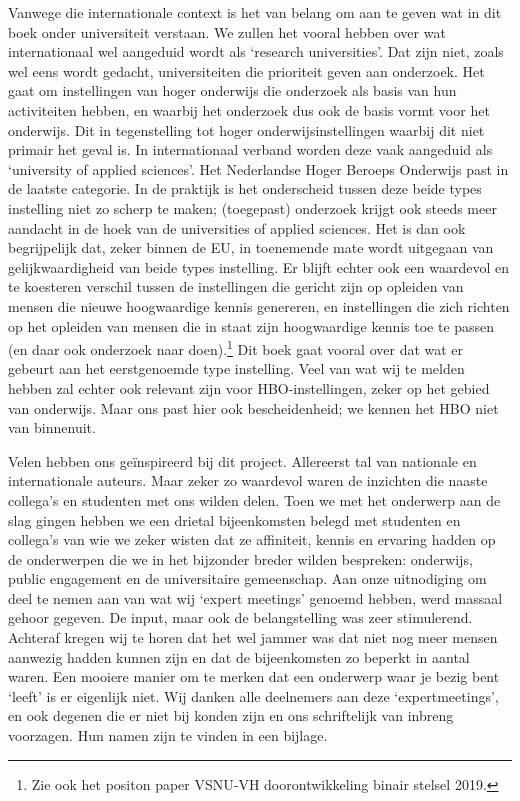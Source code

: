 \documentclass{jote-book}
\begin{document}
	Vanwege die internationale context is het van belang om aan te geven wat in dit boek onder universiteit verstaan. We zullen het vooral hebben over wat internationaal wel aangeduid wordt als ‘research universities'. Dat zijn niet, zoals wel eens wordt gedacht, universiteiten die prioriteit geven aan onderzoek. Het gaat om instellingen van hoger onderwijs die onderzoek als basis van hun activiteiten hebben, en waarbij het onderzoek dus ook de basis vormt voor het onderwijs. Dit in tegenstelling tot hoger onderwijsinstellingen waarbij dit niet primair het geval is. In internationaal verband worden deze vaak aangeduid als ‘university of applied sciences'. Het Nederlandse Hoger Beroeps Onderwijs past in de laatste categorie. In de praktijk is het onderscheid tussen deze beide types instelling niet zo scherp te maken; (toegepast) onderzoek krijgt ook steeds meer aandacht in de hoek van de universities of applied sciences. Het is dan ook begrijpelijk dat, zeker binnen de EU, in toenemende mate wordt uitgegaan van gelijkwaardigheid van beide types instelling. Er blijft echter ook een waardevol en te koesteren verschil tussen de instellingen die gericht zijn op opleiden van mensen die nieuwe hoogwaardige kennis genereren, en instellingen die zich richten op het opleiden van mensen die in staat zijn hoogwaardige kennis toe te passen (en daar ook onderzoek naar doen).\footnote{Zie ook het positon paper VSNU-VH doorontwikkeling binair stelsel 2019.} Dit boek gaat vooral over dat wat er gebeurt aan het eerstgenoemde type instelling. Veel van wat wij te melden hebben zal echter ook relevant zijn voor HBO-instellingen, zeker op het gebied van onderwijs. Maar ons past hier ook bescheidenheid; we kennen het HBO niet van binnenuit.



	Velen hebben ons geïnspireerd bij dit project. Allereerst tal van nationale en internationale auteurs. Maar zeker zo waardevol waren de inzichten die naaste collega's en studenten met ons wilden delen. Toen we met het onderwerp aan de slag gingen hebben we een drietal bijeenkomsten belegd met studenten en collega's van wie we zeker wisten dat ze affiniteit, kennis en ervaring hadden op de onderwerpen die we in het bijzonder breder wilden bespreken: onderwijs, public engagement en de universitaire gemeenschap. Aan onze uitnodiging om deel te nemen aan van wat wij ‘expert meetings' genoemd hebben, werd massaal gehoor gegeven. De input, maar ook de belangstelling was zeer stimulerend. Achteraf kregen wij te horen dat het wel jammer was dat niet nog meer mensen aanwezig hadden kunnen zijn en dat de bijeenkomsten zo beperkt in aantal waren. Een mooiere manier om te merken dat een onderwerp waar je bezig bent ‘leeft' is er eigenlijk niet. Wij danken alle deelnemers aan deze ‘expertmeetings', en ook degenen die er niet bij konden zijn en ons schriftelijk van inbreng voorzagen. Hun namen zijn te vinden in een bijlage.
\end{document}
